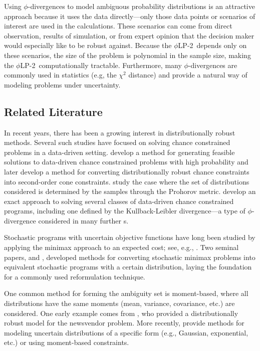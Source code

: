 \documentclass[12pt]{article}
\theoremstyle{plain}
\theoremstyle{definition}
\theoremstyle{remark}
\newcommand{\plp}{$\phi$LP-2}
\begin{document}
Using $\phi$-divergences to model ambiguous probability distributions is an attractive approach because it uses the data directly---only those data points or scenarios of interest are used in the calculations.
These scenarios can come from direct observation, results of simulation, or from expert opinion that the decision maker would especially like to be robust against.
Because the \plp\ depends only on these scenarios, the size of the problem is polynomial in the sample size, making the \plp\ computationally tractable.
Furthermore, many $\phi$-divergences are commonly used in statistics (e.g, the $\chi^2$ distance) and provide a natural way of modeling problems under uncertainty. 

\subsection{Related Literature}

In recent years, there has been a growing interest in distributionally robust methods.
Several such studies have focused on solving chance constrained problems in a data-driven setting.
\citet{calafiore2005uncertain} develop a method for generating feasible solutions to data-driven chance constrained problems with high probability and later \citet{calafiore2006distributionally} develop a method for converting distributionally robust chance constraints into second-order cone constraints.
\citet{erdogan2006ambiguous} study the case where the set of distributions considered is determined by the samples through the Prohorov metric.
\citet{jiang2012data} develop an exact approach to solving several classes of data-driven chance constrained programs, including one defined by the Kullback-Leibler divergence---a type of $\phi$-divergence considered in many further s.

Stochastic programs with uncertain objective functions have long been studied by applying the minimax approach to an expected cost; see, e.g., \citep{zackova1966minimax,dupacova_87}.
Two seminal papers, \citet{shapiro2002minimax} and \citet{shapiro2004class}, developed methods for converting stochastic minimax problems into equivalent stochastic programs with a certain distribution, laying the foundation for a commonly used reformulation technique.

One common method for forming the ambiguity set is moment-based, where all distributions have the same moments (mean, variance, covariance, etc.) are considered.
One early example comes from \citet{scarf1958min}, who provided a distributionally robust model for the newsvendor problem.
More recently, \citet{delage2010distributionally} provide methods for modeling uncertain distributions of a specific form (e.g., Gaussian, exponential, etc.) or using moment-based constraints.
\end{document}

